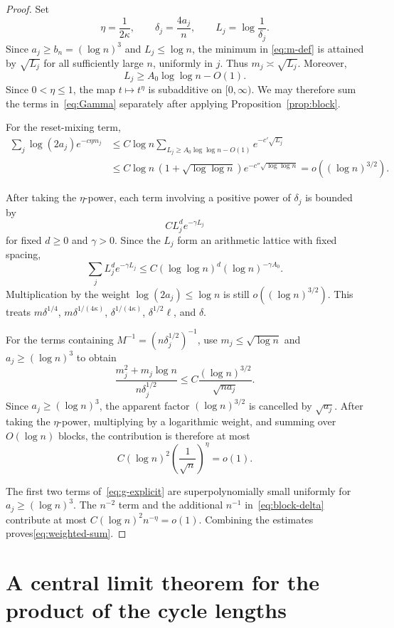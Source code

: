 \documentclass[11pt]{article}
\theoremstyle{remark}
\begin{document}
\begin{proof}
Set
\[
 \eta=\frac1{2\kappa},
 \qquad
 \delta_j=\frac{4a_j}{n},
 \qquad
 L_j=\log\frac1{\delta_j}.
\]
Since $a_j\geq b_n=(\log n)^3$ and $L_j\leq\log n$, the minimum in
\eqref{eq:m-def} is attained by $\sqrt{L_j}$ for all sufficiently large
$n$, uniformly in $j$.  Thus $m_j\asymp\sqrt{L_j}$.  Moreover,
\[
 L_j\geq A_0\log\log n-O(1).
\]
Since $0<\eta\leq1$, the map $t\mapsto t^\eta$ is subadditive on
$[0,\infty)$.  We may therefore sum the terms in~\eqref{eq:Gamma}
separately after applying Proposition~\ref{prop:block}.

For the reset-mixing term,
\begin{align*}
 \sum_j\log(2a_j)e^{-c\eta m_j}
 &\leq C\log n\sum_{L_j\geq A_0\log\log n-O(1)}e^{-c'\sqrt{L_j}}\\
 &\leq C\log n\,(1+\sqrt{\log\log n})
 e^{-c''\sqrt{\log\log n}}
 =o((\log n)^{3/2}).
\end{align*}

After taking the $\eta$-power, each term involving a positive power of
$\delta_j$ is bounded by
\[
 C L_j^d e^{-\gamma L_j}
\]
for fixed $d\geq0$ and $\gamma>0$.  Since the $L_j$ form an arithmetic
lattice with fixed spacing,
\[
 \sum_j L_j^d e^{-\gamma L_j}
 \leq C(\log\log n)^d(\log n)^{-\gamma A_0}.
\]
Multiplication by the weight $\log(2a_j)\leq\log n$ is still
$o((\log n)^{3/2})$.  This treats
$m\delta^{1/4}$, $m\delta^{1/(4\kappa)}$,
$\delta^{1/(4\kappa)}$, $\delta^{1/2}\ell$, and $\delta$.

For the terms containing $M^{-1}=(n\delta_j^{1/2})^{-1}$, use
$m_j\leq\sqrt{\log n}$ and $a_j\geq(\log n)^3$ to obtain
\[
 \frac{m_j^2+m_j\log n}{n\delta_j^{1/2}}
 \leq C\frac{(\log n)^{3/2}}{\sqrt{na_j}}.
\]
Since $a_j\geq(\log n)^3$, the apparent factor
$(\log n)^{3/2}$ is cancelled by $\sqrt{a_j}$.  After taking the
$\eta$-power, multiplying by a logarithmic weight, and summing over
$O(\log n)$ blocks, the contribution is therefore at most
\[
 C(\log n)^2
 \left(\frac1{\sqrt n}\right)^\eta=o(1).
\]

The first two terms of~\eqref{eq:g-explicit} are superpolynomially small
uniformly for $a_j\geq(\log n)^3$.  The $n^{-2}$ term and the additional
$n^{-1}$ in~\eqref{eq:block-delta} contribute at most
$C(\log n)^2n^{-\eta}=o(1)$.  Combining the estimates proves\eqref{eq:weighted-sum}.
\end{proof}

\section{A central limit theorem for the product of the cycle lengths}
\end{document}
